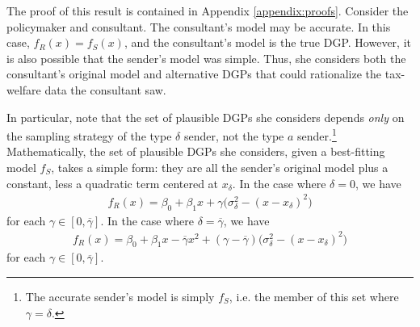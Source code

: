 \documentclass[11pt,dvipsnames]{article}
\begin{document}
The proof of this result is contained in Appendix \ref{appendix:proofs}.
Consider the policymaker and consultant. The consultant's model may be accurate.
In this case, $f_R(x) = f_S(x)$, and the consultant's model is the true DGP.
However, it is also possible that the sender's model was simple.
Thus, she considers both the consultant's original model and alternative DGPs that could rationalize the tax-welfare data the consultant saw.

In particular, note that the set of plausible DGPs she considers depends \emph{only} on the sampling strategy of the type $\delta$ sender, not the type $a$ sender.\footnote{The accurate sender's model is simply $f_S$, i.e. the member of this set where $\gamma=\delta$.}
Mathematically, the set of plausible DGPs she considers, given a best-fitting model $f_S$, takes a simple form: they are all the sender's original model plus a constant, less a quadratic term centered at $x_\delta$.
In the case where $\delta = 0$, we have
\begin{align*}
f_R(x) = \beta_0+\beta_1x+\gamma\big(\sigma_\delta^2-(x-x_\delta)^2\big)	
\end{align*}
for each $\gamma \in [0,\overline{\gamma}]$.
In the case where $\delta = \overline{\gamma}$, we have
\begin{align*}
f_R(x) = \beta_0+\beta_1x-\overline{\gamma}x^2 + (\gamma-\overline{\gamma})\big(\sigma_\delta^2-(x-x_\delta)^2\big)	
\end{align*}
for each $\gamma \in [0,\overline{\gamma}]$.
\end{document}
